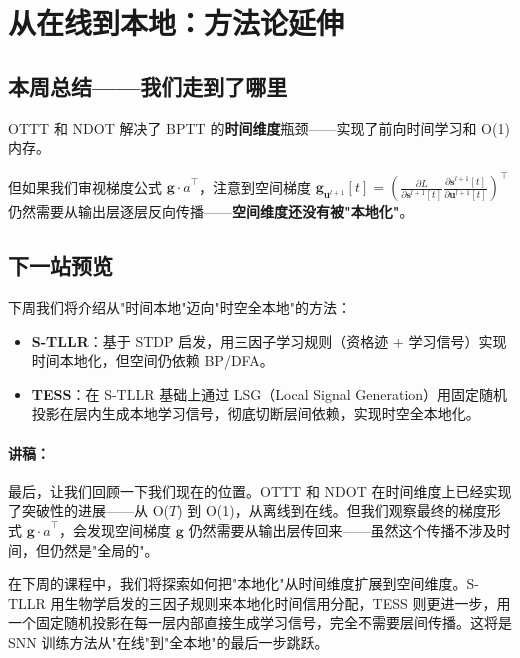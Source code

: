 \documentclass[journal,12pt,onecolumn]{IEEEtran}
\begin{document}
\section{从在线到本地：方法论延伸}

\subsection*{本周总结——我们走到了哪里}

OTTT 和 NDOT 解决了 BPTT 的\textbf{时间维度}瓶颈——实现了前向时间学习和 O(1) 内存。

但如果我们审视梯度公式 $\mathbf{g} \cdot \hat{a}^\top$，注意到空间梯度 $\mathbf{g}_{\mathbf{u}^{l+1}}[t] = \left( \frac{\partial L}{\partial \mathbf{s}^{l+1}[t]} \frac{\partial \mathbf{s}^{l+1}[t]}{\partial \mathbf{u}^{l+1}[t]} \right)^\top$ 仍然需要从输出层逐层反向传播——\textbf{空间维度还没有被"本地化"}。

\subsection*{下一站预览}

下周我们将介绍从"时间本地"迈向"时空全本地"的方法：
\begin{itemize}
    \item \textbf{S-TLLR}：基于 STDP 启发，用三因子学习规则（资格迹 + 学习信号）实现时间本地化，但空间仍依赖 BP/DFA。
    \item \textbf{TESS}：在 S-TLLR 基础上通过 LSG（Local Signal Generation）用固定随机投影在层内生成本地学习信号，彻底切断层间依赖，实现时空全本地化。
\end{itemize}

\paragraph{讲稿：}
最后，让我们回顾一下我们现在的位置。OTTT 和 NDOT 在时间维度上已经实现了突破性的进展——从 O($T$) 到 O(1)，从离线到在线。但我们观察最终的梯度形式 $\mathbf{g} \cdot \hat{a}^\top$，会发现空间梯度 $\mathbf{g}$ 仍然需要从输出层传回来——虽然这个传播不涉及时间，但仍然是"全局的"。

在下周的课程中，我们将探索如何把"本地化"从时间维度扩展到空间维度。S-TLLR 用生物学启发的三因子规则来本地化时间信用分配，TESS 则更进一步，用一个固定随机投影在每一层内部直接生成学习信号，完全不需要层间传播。这将是 SNN 训练方法从"在线"到"全本地"的最后一步跳跃。



\end{document}
